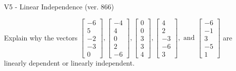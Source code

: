 \begin{exercise}
  \begin{exerciseTitle}V5 - Linear Independence (ver. 866)\end{exerciseTitle}
  \begin{exerciseStatement}
    Explain why the vectors \(\left[\begin{array}{r}
-6 \\
5 \\
-2 \\
-3 \\
0
\end{array}\right] , \left[\begin{array}{r}
-4 \\
4 \\
0 \\
2 \\
-6
\end{array}\right] , \left[\begin{array}{r}
0 \\
0 \\
3 \\
3 \\
4
\end{array}\right] , \left[\begin{array}{r}
4 \\
2 \\
-3 \\
-6 \\
3
\end{array}\right] , \text{ and } \left[\begin{array}{r}
-6 \\
-1 \\
3 \\
-5 \\
1
\end{array}\right]\) are linearly dependent or linearly independent.	



\end{exerciseStatement}
\end{exercise}
